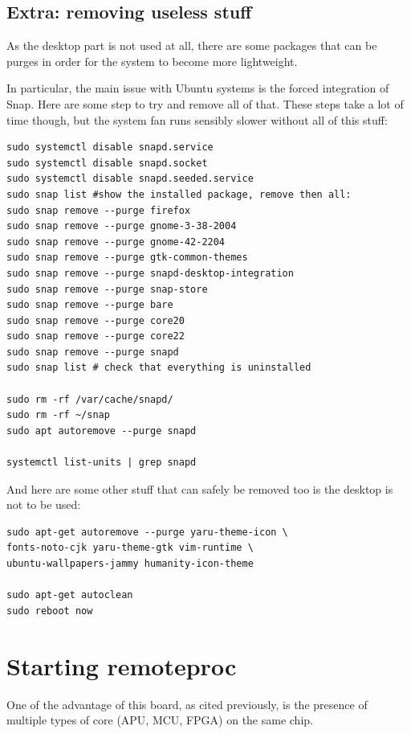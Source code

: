 \documentclass[10pt]{article}
\begin{document}
\subsection{Extra: removing useless stuff}
\label{sec:extr-remov-usel}
As the desktop part is not used at all, there are some packages
that can be purges in order for the system to become more lightweight.

In particular, the main issue with Ubuntu systems is the forced integration of Snap.
Here are some step to try and remove all of that. These steps
take a lot of time though, but the system fan runs sensibly slower
without all of this stuff:
\begin{tcolorbox}
\begin{verbatim}
sudo systemctl disable snapd.service
sudo systemctl disable snapd.socket
sudo systemctl disable snapd.seeded.service
sudo snap list #show the installed package, remove then all:
sudo snap remove --purge firefox
sudo snap remove --purge gnome-3-38-2004
sudo snap remove --purge gnome-42-2204
sudo snap remove --purge gtk-common-themes
sudo snap remove --purge snapd-desktop-integration
sudo snap remove --purge snap-store
sudo snap remove --purge bare
sudo snap remove --purge core20
sudo snap remove --purge core22
sudo snap remove --purge snapd
sudo snap list # check that everything is uninstalled

sudo rm -rf /var/cache/snapd/
sudo rm -rf ~/snap
sudo apt autoremove --purge snapd

systemctl list-units | grep snapd
\end{verbatim}
\end{tcolorbox}

And here are some other stuff that can safely be removed too is the desktop is not to be used:
\begin{tcolorbox}
\begin{verbatim}
sudo apt-get autoremove --purge yaru-theme-icon \
fonts-noto-cjk yaru-theme-gtk vim-runtime \
ubuntu-wallpapers-jammy humanity-icon-theme

sudo apt-get autoclean
sudo reboot now
\end{verbatim}
\end{tcolorbox}

\section{Starting remoteproc}
\label{sec:starting-remoteproc}
One of the advantage of this board, as cited previously, is the presence of
multiple types of core (APU, MCU, FPGA) on the same chip.
\end{document}

